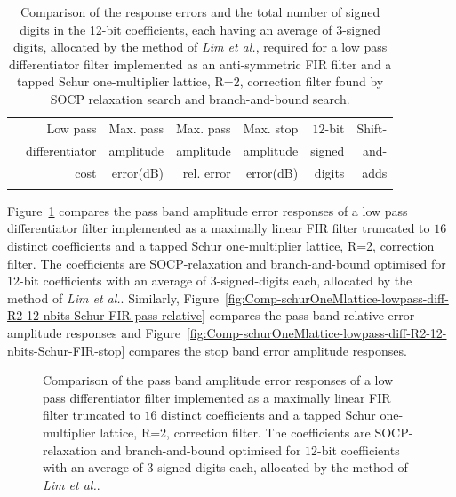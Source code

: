 \documentclass[a4paper,twoside,10pt,english]{article}
\newcommand{\DesignOfSchurLatticeFiltersPdfScale}{1}
\begin{document}
\begin{table}
\centering
\begin{threeparttable}
\begin{tabular}{lrrrrrr} \\ \toprule
 &Low pass        &Max. pass&Max. pass &Max. stop &$12$-bit&Shift-\\
 &differentiator  &amplitude&amplitude &amplitude &signed  &and-  \\
 &cost            &error(dB)&rel. error&error(dB) &digits  &adds  \\
\midrule

\\ \bottomrule
\end{tabular}
\end{threeparttable}
\caption[Comparison of low pass differentiator filter FIR and Schur lattice implementations]
{Comparison of the response errors and the total number of signed digits in the
  12-bit coefficients, each having an average of 3-signed digits, allocated by
  the method of \emph{Lim et al.}, required for a low pass differentiator filter
  implemented as an anti-symmetric FIR filter and a tapped Schur one-multiplier
  lattice, R=2, correction filter found by SOCP relaxation search and
  branch-and-bound search.}
\label{tab:Comp-schurOneMlattice-lowpass-diff-R2-12-nbits-Schur-FIR-cost}
\end{table}

Figure~\ref{fig:Comp-schurOneMlattice-lowpass-diff-R2-12-nbits-Schur-FIR-pass}
compares the pass band amplitude error responses of a low pass
differentiator filter implemented as a maximally linear FIR filter truncated to
$16$ distinct coefficients and a tapped Schur one-multiplier lattice, R=2,
correction filter. The coefficients are SOCP-relaxation and branch-and-bound
optimised for $12$-bit coefficients with an average of
$3$-signed-digits each, allocated by the method of \emph{Lim et al.}\;.
Similarly,
Figure~\ref{fig:Comp-schurOneMlattice-lowpass-diff-R2-12-nbits-Schur-FIR-pass-relative}
compares the pass band relative error amplitude responses and
Figure~\ref{fig:Comp-schurOneMlattice-lowpass-diff-R2-12-nbits-Schur-FIR-stop}
compares the stop band error amplitude responses.

\begin{figure}
\centering
\scalebox{\DesignOfSchurLatticeFiltersPdfScale}{}
\caption{Comparison of the pass band amplitude error responses of a low pass
  differentiator filter implemented as a maximally linear FIR filter truncated
  to $16$ distinct coefficients and a tapped Schur one-multiplier lattice, R=2,
  correction filter. The coefficients are SOCP-relaxation and branch-and-bound
  optimised for $12$-bit coefficients with an average of
  $3$-signed-digits each, allocated by the method of \emph{Lim et al.}\;.}
\label{fig:Comp-schurOneMlattice-lowpass-diff-R2-12-nbits-Schur-FIR-pass}
\end{figure}
\end{document}
